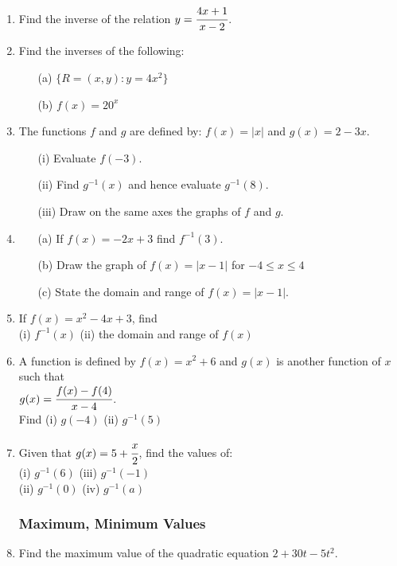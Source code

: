 \begin{enumerate}
	\item Find the inverse of the relation $y = \cfrac{4x + 1}{x - 2}$.
	
	\item Find the inverses of the following:
		\begin{itemize}
		\item[(a)] $\{R = (x,y): y = 4x^2\}$
		\item[(b)] $f(x) = 20^x$
		\end{itemize}
		
	\item The functions $f$ and $g$ are defined by: $f(x) = |x|$ and $g(x) = 2 - 3x$.
		\begin{itemize}
		\item[(i)] Evaluate $f(-3)$.
		\item[(ii)] Find $g^{-1}(x)$ and hence evaluate $g^{-1}(8)$.
		\item[(iii)] Draw on the same axes the graphs of $f$ and $g$.
		\end{itemize}

	\item 
		\begin{itemize}
		\item[(a)] If $f(x) = -2x + 3$ find $f^{-1}(3)$.
		\item[(b)] Draw the graph of $f(x) = |x - 1|$ for $-4 \leq x \leq 4$
		\item[(c)] State the domain and range of $f(x) = |x - 1|$.
		\end{itemize}
		
	\item If $f(x) = x^2 - 4x + 3$, find\\
	(i) $f^{-1}(x)$ \quad (ii) the domain and range of $f(x)$
	
	\item A function is defined by $f(x) = x^2 + 6$ and $g(x)$ is another function of $x$ such that\\
	 $g(x) = \cfrac{f(x) - f(4)}{x - 4}$. \\
	Find (i) $g(-4)$ \quad (ii) $g^{-1}(5)$
	
	\item Given that $g(x) = 5 + \cfrac{x}{2}$, find the values of:\\
	(i) $g^{-1}(6)$ \quad (iii) $g^{-1}(-1)$\\
	(ii) $g^{-1}(0)$ \quad (iv) $g^{-1}(a)$
	
			\subsubsection{Maximum, Minimum Values}
	\item Find the maximum value of the quadratic equation $2 + 30t - 5t^2$.
	

\end{enumerate}
